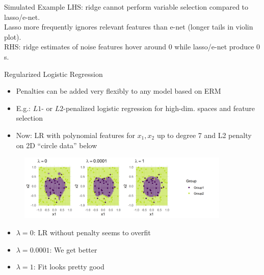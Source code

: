 \documentclass[11pt,compress,t,notes=noshow, xcolor=table]{beamer}
\begin{document}
\begin{vbframe} {Simulated Example}
\footnotesize
LHS: ridge cannot perform variable selection compared to lasso/e-net. \\
Lasso more frequently ignores relevant features than e-net (longer tails in violin plot).\\
RHS: ridge estimates of noise features hover around $0$ while lasso/e-net produce $0$s.

\end{vbframe}



\begin{vbframe}{Regularized Logistic Regression}

\begin{itemize}

\item Penalties can be added very flexibly to any model based on ERM

\item E.g.: $L1$- or $L2$-penalized logistic regression for high-dim. spaces and feature selection



\item Now: LR with polynomial features for $x_1, x_2$ up to degree 7 and L2 penalty on 2D ``circle data'' below

\end{itemize}

\begin{figure}
\includegraphics[width=0.9\textwidth]{figure/reg_logreg.png}\\
\end{figure}

\begin{itemize}
\item $\lambda = 0$: LR without penalty seems to overfit
\item $\lambda = 0.0001$: We get better
\item $\lambda = 1$: Fit looks pretty good
\end{itemize}


\end{vbframe}


\endlecture
\end{document}
